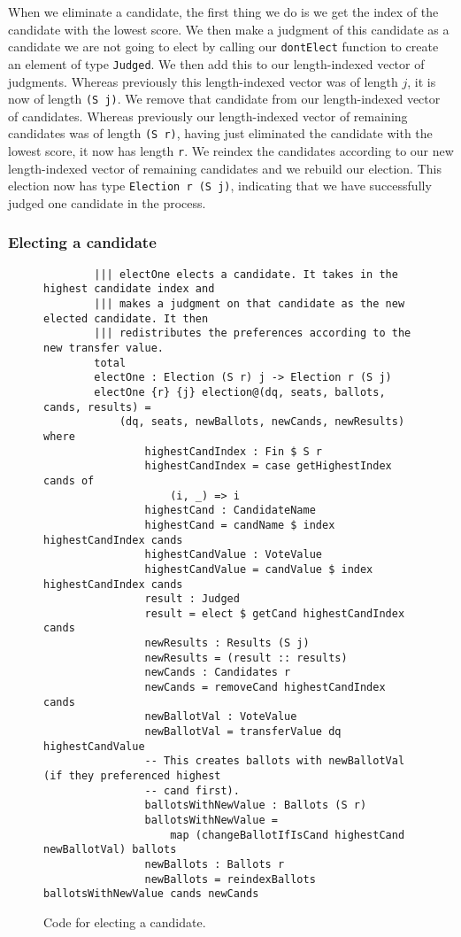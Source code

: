 When we eliminate a candidate, the first thing we do is we get the index of the
candidate with the lowest score. We then make a judgment of this candidate as a
candidate we are not going to elect by calling our \texttt{dontElect} function
to create an element of type \texttt{Judged}. We then add this to our
length-indexed vector of judgments. Whereas previously this length-indexed
vector was of length $j$, it is now of length \texttt{(S j)}. We remove that
candidate from our length-indexed vector of candidates. Whereas previously our
length-indexed vector of remaining candidates was of length \texttt{(S r)},
having just eliminated the candidate with the lowest score, it now has length
\texttt{r}. We reindex the candidates according to our new length-indexed vector
of remaining candidates and we rebuild our election. This election now has type
\texttt{Election r (S j)}, indicating that we have successfully judged one
candidate in the process. 

\subsubsection{Electing a candidate}

\begin{figure}[ht!!!!!!!!]
	\caption{Code for electing a candidate.}
	\label{elect_cand_code}
    \begin{lstlisting}
        ||| electOne elects a candidate. It takes in the highest candidate index and
        ||| makes a judgment on that candidate as the new elected candidate. It then
        ||| redistributes the preferences according to the new transfer value. 
        total
        electOne : Election (S r) j -> Election r (S j)
        electOne {r} {j} election@(dq, seats, ballots, cands, results) = 
            (dq, seats, newBallots, newCands, newResults) where
                highestCandIndex : Fin $ S r
                highestCandIndex = case getHighestIndex cands of
                    (i, _) => i
                highestCand : CandidateName
                highestCand = candName $ index highestCandIndex cands
                highestCandValue : VoteValue
                highestCandValue = candValue $ index highestCandIndex cands
                result : Judged
                result = elect $ getCand highestCandIndex cands
                newResults : Results (S j)
                newResults = (result :: results)
                newCands : Candidates r
                newCands = removeCand highestCandIndex cands
                newBallotVal : VoteValue
                newBallotVal = transferValue dq highestCandValue
                -- This creates ballots with newBallotVal (if they preferenced highest
                -- cand first). 
                ballotsWithNewValue : Ballots (S r)
                ballotsWithNewValue = 
                    map (changeBallotIfIsCand highestCand newBallotVal) ballots
                newBallots : Ballots r
                newBallots = reindexBallots ballotsWithNewValue cands newCands
    \end{lstlisting}
\end{figure}

